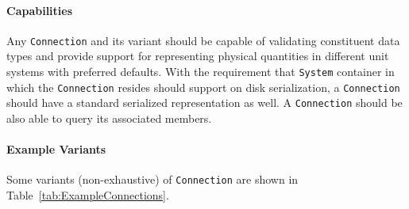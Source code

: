 \documentclass[12pt]{article}
\begin{document}
\paragraph{Capabilities}
Any \texttt{Connection} and its variant should be capable of validating constituent data types and provide support for representing physical quantities in different unit systems with preferred defaults. With the requirement that \texttt{System} container in which the \texttt{Connection} resides should support on disk serialization, a \texttt{Connection} should have a standard serialized representation as well. A \texttt{Connection} should be also able to query its associated members.

\paragraph{Example Variants}  Some variants (non-exhaustive) of \texttt{Connection} are shown in Table~\ref{tab:ExampleConnections}.
\end{document}

